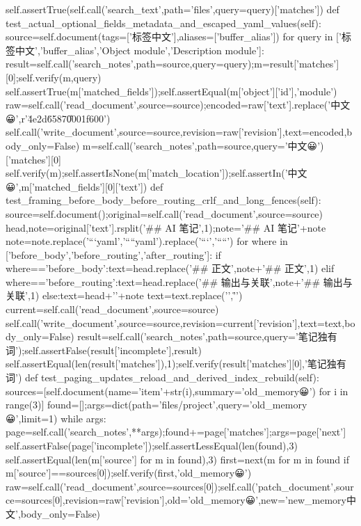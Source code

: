             self.assertTrue(self.call('search_text',path='files',query=query)['matches'])
    def test_actual_optional_fields_metadata_and_escaped_yaml_values(self):
        source=self.document(tags=['标签中文'],aliases=['buffer_alias'])
        for query in ['标签中文','buffer_alias','Object module','Description module']:
            result=self.call('search_notes',path=source,query=query);m=result['matches'][0];self.verify(m,query)
            self.assertTrue(m['matched_fields']);self.assertEqual(m['object']['id'],'module')
        raw=self.call('read_document',source=source);encoded=raw['text'].replace('中文😀',r'\u4e2d\u6587\U0001f600')
        self.call('write_document',source=source,revision=raw['revision'],text=encoded,body_only=False)
        m=self.call('search_notes',path=source,query='中文😀')['matches'][0]
        self.verify(m);self.assertIsNone(m['match_location']);self.assertIn('中文😀',m['matched_fields'][0]['text'])
    def test_framing_before_body_before_routing_crlf_and_long_fences(self):
        source=self.document();original=self.call('read_document',source=source)
        head,note=original['text'].rsplit('\n## AI 笔记\n',1);note='## AI 笔记\n'+note
        note=note.replace('```yaml','````yaml').replace('\n```\n','\n````\n')
        for where in ['before_body','before_routing','after_routing']:
            if where=='before_body':text=head.replace('## 正文',note+'\n## 正文',1)
            elif where=='before_routing':text=head.replace('## 输出与关联',note+'\n## 输出与关联',1)
            else:text=head+'\n'+note
            text=text.replace('\n','\r\n')
            current=self.call('read_document',source=source)
            self.call('write_document',source=source,revision=current['revision'],text=text,body_only=False)
            result=self.call('search_notes',path=source,query='笔记独有词');self.assertFalse(result['incomplete'],result)
            self.assertEqual(len(result['matches']),1);self.verify(result['matches'][0],'笔记独有词')
    def test_paging_updates_reload_and_derived_index_rebuild(self):
        sources=[self.document(name='item'+str(i),summary='old_memory😀') for i in range(3)]
        found=[];args=dict(path='files/project',query='old_memory😀',limit=1)
        while args:
            page=self.call('search_notes',**args);found+=page['matches'];args=page['next']
            self.assertFalse(page['incomplete']);self.assertLessEqual(len(found),3)
        self.assertEqual(len({m['source'] for m in found}),3)
        first=next(m for m in found if m['source']==sources[0]);self.verify(first,'old_memory😀')
        raw=self.call('read_document',source=sources[0]);self.call('patch_document',source=sources[0],revision=raw['revision'],old='old_memory😀',new='new_memory中文',body_only=False)
